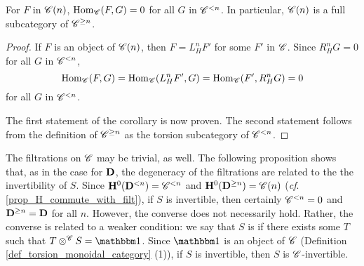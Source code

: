 \begin{cor}\label{cor_sg_sub_prerad}
For $F$ in $\SGFilt{n}{\Cat{C}}$, $\hom_{\Cat{C}}(F, G) = 0$ for
all $G$ in $\Corad{n}{\Cat{C}}$. In particular, $\SGFilt{n}{\Cat{C}}$
is a full subcategory of $\Prerad{n}{\Cat{C}}$.
\end{cor}
\begin{proof}
If $F$ is an object of $\SGFilt{n}{\Cat{C}}$, then $F = L_H^n F'$ for
some $F'$ in $\Cat{C}$. Since $R_H^n G = 0$ for all $G$ in 
$\Corad{n}{\Cat{C}}$,
\[
\hom_{\Cat{C}}(F, G) = \hom_{\Cat{C}}(L_H^n F', G) = \hom_{\Cat{C}}(F', R_H^n G) = 0
\]
for all $G$ in $\Corad{n}{\Cat{C}}$.

The first statement of the corollary is now proven. The second 
statement follows from the definition of $\Prerad{n}{\Cat{C}}$ as 
the torsion subcategory of $\Corad{n}{\Cat{C}}$.
\end{proof}

The filtrations on $\Cat{C}$ may be trivial, as well. The following
proposition shows that, as in the case for $\DCat$, the degeneracy
of the filtrations are related to the the invertibility of $S$.
Since $\HH^0(\Corad{n}{\DCat}) = \Corad{n}{\Cat{C}}$ and
$\HH^0(\Prerad{n}{\DCat}) = \SGFilt{n}{\Cat{C}}$ (\emph{cf}. 
\ref{prop_H_commute_with_filt}), if $S$ is invertible, then certainly
$\Corad{n}{\Cat{C}} = 0$ and $\Prerad{n}{\DCat} = \DCat$ for all $n$.
However, the converse does not necessarily hold. Rather, the converse
is related to a weaker condition: we say that $S$ is 
 if there exists some $T$ such
that $T \tensor^{\Cat{C}} S = \Unit$. Since $\Unit$ is an object of
$\Cat{C}$ (Definition \ref{def_torsion_monoidal_category} (1)), if
$S$ is invertible, then $S$ is $\Cat{C}$-invertible.

